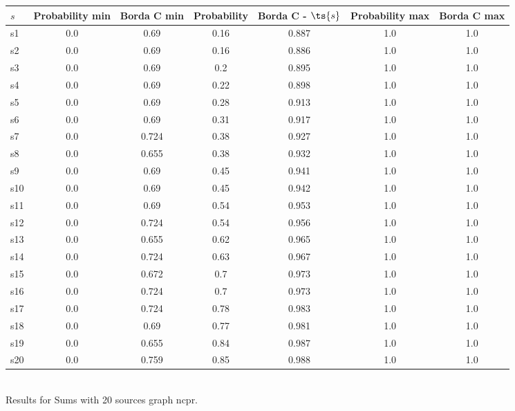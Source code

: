 \documentclass{article}
\begin{document}
\noindent\begin{tabular}{|l|c|c|c|c|c|c|}
\hline
$s$& Probability min & Borda C min & Probability & Borda C - $\ts{s}$ & Probability max & Borda C max\\
\hline
s1 &0.0 & 0.69 & 0.16 & 0.887 & 1.0 & 1.0\\
\hline
s2 &0.0 & 0.69 & 0.16 & 0.886 & 1.0 & 1.0\\
\hline
s3 &0.0 & 0.69 & 0.2 & 0.895 & 1.0 & 1.0\\
\hline
s4 &0.0 & 0.69 & 0.22 & 0.898 & 1.0 & 1.0\\
\hline
s5 &0.0 & 0.69 & 0.28 & 0.913 & 1.0 & 1.0\\
\hline
s6 &0.0 & 0.69 & 0.31 & 0.917 & 1.0 & 1.0\\
\hline
s7 &0.0 & 0.724 & 0.38 & 0.927 & 1.0 & 1.0\\
\hline
s8 &0.0 & 0.655 & 0.38 & 0.932 & 1.0 & 1.0\\
\hline
s9 &0.0 & 0.69 & 0.45 & 0.941 & 1.0 & 1.0\\
\hline
s10 &0.0 & 0.69 & 0.45 & 0.942 & 1.0 & 1.0\\
\hline
s11 &0.0 & 0.69 & 0.54 & 0.953 & 1.0 & 1.0\\
\hline
s12 &0.0 & 0.724 & 0.54 & 0.956 & 1.0 & 1.0\\
\hline
s13 &0.0 & 0.655 & 0.62 & 0.965 & 1.0 & 1.0\\
\hline
s14 &0.0 & 0.724 & 0.63 & 0.967 & 1.0 & 1.0\\
\hline
s15 &0.0 & 0.672 & 0.7 & 0.973 & 1.0 & 1.0\\
\hline
s16 &0.0 & 0.724 & 0.7 & 0.973 & 1.0 & 1.0\\
\hline
s17 &0.0 & 0.724 & 0.78 & 0.983 & 1.0 & 1.0\\
\hline
s18 &0.0 & 0.69 & 0.77 & 0.981 & 1.0 & 1.0\\
\hline
s19 &0.0 & 0.655 & 0.84 & 0.987 & 1.0 & 1.0\\
\hline
s20 &0.0 & 0.759 & 0.85 & 0.988 & 1.0 & 1.0\\
\hline
\end{tabular}\\

\noindent Results for Sums with 20 sources graph ncpr.
\end{document}
